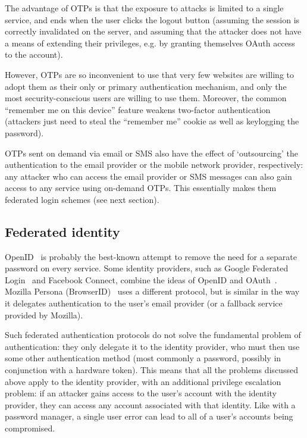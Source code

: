 The advantage of OTPs is that the exposure to attacks is limited to a single service, and ends when
the user clicks the logout button (assuming the session is correctly invalidated on the server, and
assuming that the attacker does not have a means of extending their privileges, e.g. by granting
themselves OAuth access to the account).

However, OTPs are so inconvenient to use that very few websites are willing to adopt them as their
only or primary authentication mechanism, and only the most security-conscious users are willing to
use them. Moreover, the common ``remember me on this device'' feature weakens two-factor
authentication (attackers just need to steal the ``remember me'' cookie as well as keylogging the
password).

OTPs sent on demand via email or SMS also have the effect of `outsourcing' the authentication to the
email provider or the mobile network provider, respectively: any attacker who can access the email
provider or SMS messages can also gain access to any service using on-demand OTPs. This essentially
makes them federated login schemes (see next section).

\subsection{Federated identity}

OpenID~\cite{OpenID} is probably the best-known attempt to remove the need for a separate password
on every service. Some identity providers, such as Google Federated Login~\cite{GoogleOpenID} and
Facebook Connect, combine the ideas of OpenID and OAuth~\cite{OAuth}. Mozilla Persona
(BrowserID)~\cite{Persona, BrowserID} uses a different protocol, but is similar in the way it
delegates authentication to the user's email provider (or a fallback service provided by Mozilla).

Such federated authentication protocols do not solve the fundamental problem of authentication: they
only delegate it to the identity provider, who must then use some other authentication method (most
commonly a password, possibly in conjunction with a hardware token). This means that all the
problems discussed above apply to the identity provider, with an additional privilege escalation
problem: if an attacker gains access to the user's account with the identity provider, they can
access any account associated with that identity. Like with a password manager, a single user error
can lead to all of a user's accounts being compromised.

